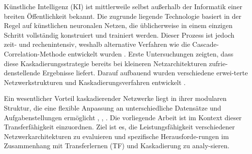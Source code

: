 Künstliche Intelligenz (KI) ist mittlerweile selbst außerhalb der Informatik einer breiten Öffentlichkeit bekannt. Die zugrunde liegende 
Technologie basiert in der Regel auf künstlichen neuronalen Netzen, die üblicherweise in einem einzigen Schritt vollständig konstruiert und 
trainiert werden. Dieser Prozess ist jedoch zeit- und rechenintensiv, weshalb alternative Verfahren wie die Cascade-Correlation-Methode 
entwickelt wurden \cite{cascor}. Erste Untersuchungen zeigten, dass diese Kaskadierungsstrategie bereits bei kleineren Netzarchitekturen 
zufrie-denstellende Ergebnisse liefert. Darauf aufbauend wurden verschiedene erwei-terte Netzwerkstrukturen und Kaskadierungsverfahren 
entwickelt \cite{cascade_network_architectures,Constructive_Cascade,deep_cascade_learning}.

Ein wesentlicher Vorteil kaskadierender Netzwerke liegt in ihrer modularen Struktur, die eine flexible Anpassung an unterschiedliche 
Datensätze und Aufgabenstellungen ermöglicht \cite{phd_deep_cascade}, \cite{transfer_learning}, \cite{survey_transfer}. Die vorliegende 
Arbeit ist im Kontext dieser Transferfähigkeit einzuordnen. Ziel ist es, die Leistungsfähigkeit verschiedener Netzwerkarchitekturen zu 
evaluieren und spezifische Herausforde-rungen im Zusammenhang mit Transferlernen (TF) und Kaskadierung zu analy-sieren.
